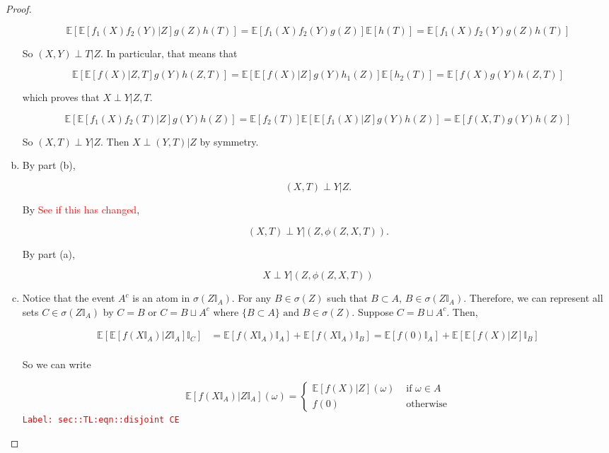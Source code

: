 \documentclass[12pt]{article}
\newcommand{\mb}{\mathbb}
\newcommand{\te}{\text}
\newcommand{\tr}{\textcolor{red}}
\newcommand{\labe}[1]{\tr{\texttt{Label: #1}}}
\newcommand{\ex}[1]{\mb{E}\left[#1\right]}			%
\newcommand{\X}{X}								%
\newcommand{\indx}[1]{_{#1}}					%
\newcommand{\XX}{Y}								%
\newcommand{\XXX}{Z}							%
\newcommand{\typset}{A}							%
\begin{document}
\begin{proof}
\begin{enumerate}[(a)]
\[\ex{\ex{f\indx{1}(\X)f\indx{2}(\XX)|\XXX}g(\XXX)h(T)} = \ex{f\indx{1}(\X)f\indx{2}(\XX)g(\XXX)}\ex{h(T)} = \ex{f\indx{1}(\X)f\indx{2}(\XX)g(\XXX)h(T)}\]

So \((\X,\XX)\perp T|\XXX\). In particular, that means that 

\[\ex{\ex{f(\X)|\XXX,T}g(\XX)h(\XXX,T)} = \ex{\ex{f(\X)|\XXX}g(\XX)h_1(\XXX)}\ex{h_2(T)} = \ex{f(\X)g(\XX)h(\XXX,T)}\]

which proves that \(\X\perp \XX|\XXX,T\).

\[\ex{\ex{f\indx{1}(\X)f\indx{2}(T)|\XXX}g(\XX)h(\XXX)} = \ex{f\indx{2}(T)}\ex{\ex{f\indx{1}(\X)|\XXX}g(\XX)h(\XXX)} = \ex{f(\X,T)g(\XX)h(\XXX)}\]

So \((\X,T)\perp \XX|\XXX\). Then \(\X\perp (\XX,T)|\XXX\) by symmetry.

\item By part (b), 

\[(\X,T)\perp \XX|\XXX.\]

By \cite[Lemma 2.10]{RamCur} \tr{See if this has changed}, 

\[(\X,T)\perp \XX|(\XXX,\phi(\XXX,\X,T)).\]

By part (a),

\[\X\perp \XX|(\XXX,\phi(\XXX,\X,T))\]

\item Notice that the event \(\typset^c\) is an atom in \(\sigma(\XXX\mb{I}_\typset)\). For any \(B \in \sigma(\XXX)\) such that \(B\subset \typset\), \(B \in \sigma(\XXX\mb{I}_\typset)\). Therefore, we can represent all sets \(C \in \sigma(\XXX\mb{I}_\typset)\) by \(C = B\) or \(C = B\sqcup \typset^c\) where \(\{B\subset \typset\}\te{ and } B \in \sigma(\XXX)\). Suppose \(C = B\sqcup \typset^c\). Then,

\begin{align*}
\ex{\ex{f(\X\mb{I}_\typset)|\XXX\mb{I}_\typset}\mb{I}_C} &= \ex{f(\X\mb{I}_\typset)\mb{I}_\typset}+\ex{f(\X\mb{I}_\typset)\mb{I}_B} = \ex{f(0)\mb{I}_\typset} + \ex{\ex{f(\X)|\XXX}\mb{I}_B}\\
\end{align*}

So we can write

\begin{equation}
\ex{f(\X\mb{I}_\typset)|\XXX\mb{I}_\typset}(\omega) = \begin{cases}
\ex{f(\X)|\XXX}(\omega) &\te{ if } \omega \in \typset\\
f(0) &\te{ otherwise}
\end{cases}
\label{sec::TL:eqn::disjoint CE}
\end{equation}
\labe{sec::TL:eqn::disjoint CE}


\end{enumerate}
\end{proof}
\end{document}
